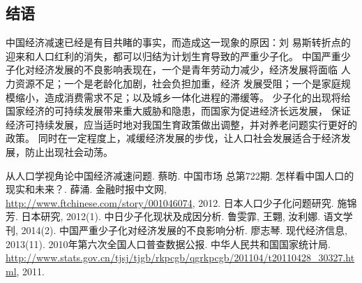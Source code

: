 \documentclass[cs5size,a4paper,nofonts]{ctexart}
\begin{document}
\begin{multicols}{2}
\section{结语}

中国经济减速已经是有目共睹的事实，而造成这一现象的原因：刘
易斯转折点的迎来和人口红利的消失，都可以归结为计划生育导致的严重少子化。
中国严重少子化对经济发展的不良影响表现在，一个是青年劳动力减少，经济发展将面临
人力资源不足；一个是老龄化加剧，社会负担加重，经济
发展受阻；一个是家庭规模缩小，造成消费需求不足；以及城乡一体化进程的滞缓等。
少子化的出现将给国家经济的可持续发展带来重大威胁和隐患，而国家为促进经济长远发展，
保证经济可持续发展，应当适时地对我国生育政策做出调整，并对养老问题实行更好的政策。
同时在一定程度上，减缓经济发展的步伐，让人口社会发展适合于经济发展，防止出现社会动荡。

\begin{thebibliography}{10}
 从人口学视角论中国经济减速问题. 蔡昉. 中国市场 总第722期.
 怎样看中国人口的现实和未来？. 薛涌. 金融时报中文网, \url{http://www.ftchinese.com/story/001046074}, 2012.
 日本人口少子化问题研究. 施锦芳. 日本研究, 2012(1).
 中日少子化现状及成因分析. 鲁雯霏, 王翾, 汝利娜. 语文学刊, 2014(2).
 中国严重少子化对经济发展的不良影响分析. 廖志琴. 现代经济信息, 2013(11).
 2010年第六次全国人口普查数据公报. 中华人民共和国国家统计局. \url{http://www.stats.gov.cn/tjsj/tjgb/rkpcgb/qgrkpcgb/201104/t20110428_30327.html}, 2011.
\end{thebibliography}

\end{multicols}
\end{document}

